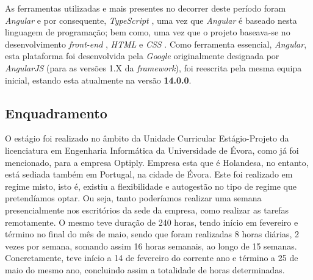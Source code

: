 \documentclass{article}
\begin{document}
\hspace*{0.5cm} As ferramentas utilizadas e mais presentes no decorrer deste período foram \emph{Angular} \cite{angular, angular-wiki, angular-docs, angular-repo} e por consequente, \emph{TypeScript} \cite{ts, ts-docs}, uma vez que \emph{Angular} é baseado nesta linguagem de programação; bem como, uma vez que o projeto baseava-se no desenvolvimento \emph{front-end} \cite{frontend}, \emph{HTML} \cite{html-article, html-wiki} e \emph{CSS} \cite{css}. \newline
\hspace*{0.5cm} Como ferramenta essencial, \emph{Angular}, esta plataforma foi desenvolvida pela \emph{Google} \cite{google} originalmente designada por \emph{AngularJS} \cite{old-angular} (para as versões 1.X da \emph{framework}), foi reescrita pela mesma equipa inicial, estando esta atualmente na versão \textbf{14.0.0}. \newline

\subsection{Enquadramento}
\hspace*{0.5cm} O estágio foi realizado no âmbito da Unidade Curricular Estágio-Projeto da licenciatura em Engenharia Informática da Universidade de Évora, como já foi mencionado, para a empresa Optiply. Empresa esta que é Holandesa, no entanto, está sediada também em Portugal, na cidade de Évora. \newline 
\hspace*{0.5cm} Este foi realizado em regime misto, isto é, existiu a flexibilidade e autogestão no tipo de regime que pretendíamos optar. Ou seja, tanto poderíamos realizar uma semana presencialmente nos escritórios da sede da empresa, como realizar as tarefas remotamente. \newline
\hspace*{0.5cm} O mesmo teve duração de 240 horas, tendo início em fevereiro e término no final do mês de maio, sendo que foram realizadas 8 horas diárias, 2 vezes por semana, somando assim 16 horas semanais, ao longo de 15 semanas. Concretamente, teve início a 14 de fevereiro do corrente ano e término a 25 de maio do mesmo ano, concluindo assim a totalidade de horas determinadas. \newline
\end{document}
